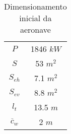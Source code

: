 \begin{table}[H]
\centering
\caption[Dimensionamento inicial da aeronave]{Dimensionamento inicial da aeronave}
\label{tbl:Dimensoes_iniciais}
\begin{tabular}{cc}
\toprule
$P$ & 1846 $kW$ \\
$S$ & 53 $m^2$ \\
$S_{eh}$ & 7.1 $m^2$ \\
$S_{ev}$  & 8.8 $m^2$ \\
$l_t$ & 13.5 $m$ \\
$\overline{c}_w$ & 2 $m$ \\
\bottomrule
\end{tabular}
\end{table}



